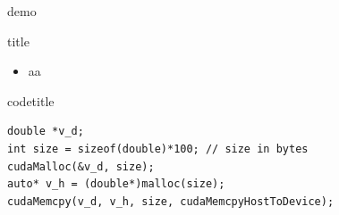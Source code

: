 \documentclass[aspectratio=43]{beamer}
\begin{document}
\begin{frame}[fragile]{demo}
    \begin{info}{title}
    \begin{itemize}
        \item aa
    \end{itemize}
    \end{info}

    \begin{code}{codetitle}
        \begin{lstlisting}[style=boxcuda]
double *v_d;
int size = sizeof(double)*100; // size in bytes
cudaMalloc(&v_d, size);
auto* v_h = (double*)malloc(size);
cudaMemcpy(v_d, v_h, size, cudaMemcpyHostToDevice);
\end{lstlisting}
    \end{code}
\end{frame}
\end{document}
